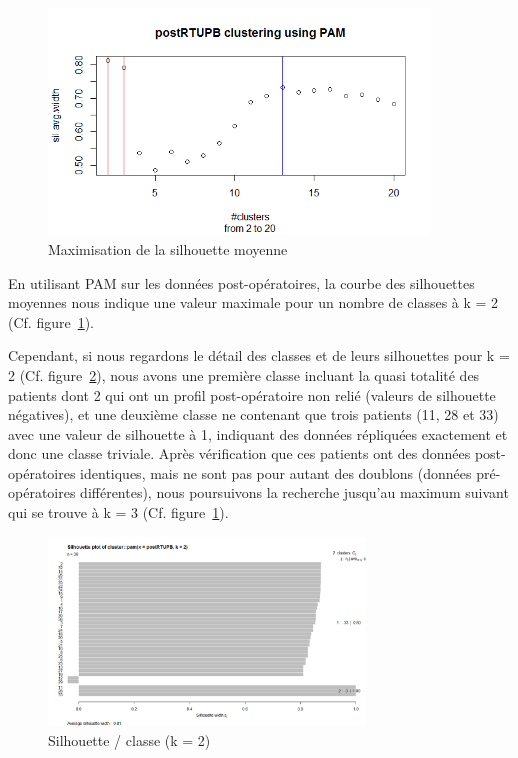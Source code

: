 %
%

\begin{figure}[H]
\centering
\includegraphics[width=0.90\textwidth]{../Fig/RTUPB/rtupb-elbow-post.png}
\caption{Maximisation de la silhouette moyenne }
\label{fig-rtupb-post-elbow}
\end{figure}

En utilisant PAM sur les données post-opératoires, la courbe des silhouettes moyennes
nous indique une valeur maximale pour un nombre de classes à k = 2 (Cf. figure~\ref{fig-rtupb-post-elbow}).

Cependant, si nous regardons le détail des classes et de leurs silhouettes pour k = 2 (Cf. figure~\ref{fig-rtupb-post-pam-k2}),
nous avons une première classe incluant la quasi totalité des patients dont 2 qui ont un profil post-opératoire non relié (valeurs de silhouette négatives), et une deuxième classe ne contenant que trois patients (11, 28 et 33)
avec une valeur de silhouette à 1, indiquant des données répliquées exactement et donc une classe triviale.
Après vérification que ces patients ont des données post-opératoires identiques, mais ne sont pas pour autant
des doublons (données pré-opératoires différentes), nous poursuivons la recherche jusqu'au maximum suivant qui se trouve à k = 3 (Cf. figure~\ref{fig-rtupb-post-elbow}).

\begin{figure}[H]
\centering
\includegraphics[width=0.75\textwidth]{../Fig/RTUPB/rtupb-sil-k2-post.png}
\caption{Silhouette / classe (k = 2) }
\label{fig-rtupb-post-pam-k2}
\end{figure}

